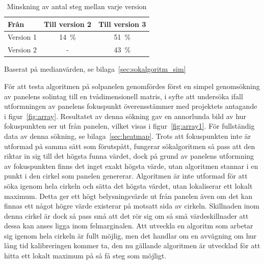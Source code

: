             \begin{table}
                \caption{\label{tab:algoritm_forbattring}Minskning av antal steg mellan varje version}
                \centering
                \begin{threeparttable}
                \begin{tabular}{@{}lcc@{}}
                \toprule
                Från        & \multicolumn{1}{l}{Till version 2} & \multicolumn{1}{l}{Till version 3} \\ \midrule
                Version 1 & 14~\%                                & 51~\%                                \\
                Version 2 & -                                    & 43~\% \\ \bottomrule
                \end{tabular}
                \begin{tablenotes}
                \item Baserat på medianvärden, se bilaga~\ref{sec:sokalgoritm_sim}
            \end{tablenotes}
            \end{threeparttable}
            \end{table}

            För att testa algoritmen på solpanelen genomfördes först en simpel genomsökning av panelens solintag till en tvådimensionell matris, i syfte att undersöka ifall utformningen av panelens fokuspunkt överensstämmer med projektets antagande i figur~\ref{fig:array}. Resultatet av denna sökning gav en annorlunda bild av hur fokuspunkten ser ut från panelen, vilket visas i figur~\ref{fig:array1}. För fullständig data av denna sökning, se bilaga~\ref{sec:heatmap}. Trots att fokuspunkten inte är utformad på samma sätt som förutspått, fungerar sökalgoritmen så pass att den riktar in sig till det högsta funna värdet, dock på grund av panelens utformning av fokuspunkten finns det inget exakt högsta värde, utan algoritmen stannar i en punkt i den cirkel som panelen genererar. Algoritmen är inte utformad för att söka igenom hela cirkeln och sätta det högsta värdet, utan lokaliserar ett lokalt maximum. Detta ger ett högt belysningsvärde ut från panelen även om det kan finnas ett något högre värde existerar på motsatt sida av cirkeln. Skillnaden inom denna cirkel är dock så pass små att det rör sig om så små värdeskillnader att dessa kan anses ligga inom felmarginalen. Att utveckla en algoritm som arbetar sig igenom hela cirkeln är fullt möjlig, men det handlar om en avvägning om hur lång tid kalibreringen kommer ta, den nu gällande algoritmen är utvecklad för att hitta ett lokalt maximum på så få steg som möjligt.
        

